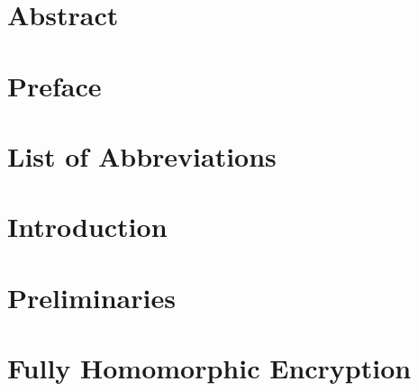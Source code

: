 \documentclass[11pt,twoside]{latex_config/eitExjobb}               %
\begin{document}



\frontmatter    %
\setlength{\parskip}{2,0 ex plus 0,5 ex minus 0,2 ex}
\setlength{\parindent}{0 em}


\chapter*{Abstract}



%


\chapter*{Preface}



\tableofcontents    %
\listofalgorithms   %
\listoffigures      %
\listoftables       %

\chapter*{List of Abbreviations}


\cleardoublepage
\mainmatter         %


\chapter{Introduction}



\chapter{Preliminaries}\label{sec:preliminaries}



\chapter{Fully Homomorphic Encryption}\label{sec:fhe_intro}

\end{document}
